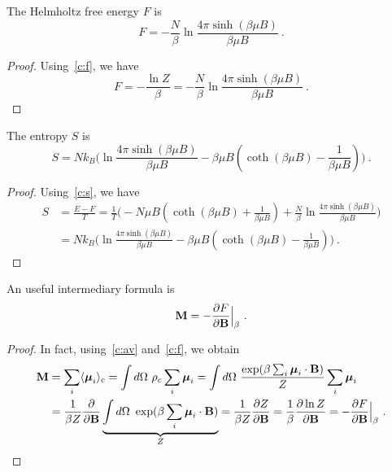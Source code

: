    The Helmholtz free energy $F$ is 
    \begin{equation*}
        F = - \frac{N}{\beta} \ln \frac{4 \pi \sinh (\beta \mu B)}{\beta \mu B} ~.
    \end{equation*}
    \begin{proof}
        Using~\eqref{c:f}, we have
        \begin{equation*}
            F = - \frac{\ln Z}{\beta} = - \frac{N}{\beta} \ln \frac{4 \pi \sinh (\beta \mu B)}{\beta \mu B} ~.
        \end{equation*}
    \end{proof}
    
    The entropy $S$ is 
    \begin{equation*}
        S = N k_B \Big ( \ln \frac{4 \pi \sinh (\beta \mu B)}{\beta \mu B}  - \beta \mu B (\coth (\beta \mu B) - \frac{1}{\beta \mu B} ) \Big ) ~.
    \end{equation*}
    \begin{proof}
        Using~\eqref{c:s}, we have
        \begin{equation*}
        \begin{aligned}
            S & = \frac{E - F}{T} = \frac{1}{T} \Big (- N \mu B (\coth (\beta \mu B) + \frac{1}{\beta \mu B} ) + \frac{N}{\beta} \ln \frac{4 \pi \sinh (\beta \mu B)}{\beta \mu B}  \Big ) \\ & = N k_B \Big ( \ln \frac{4 \pi \sinh (\beta \mu B)}{\beta \mu B}  - \beta \mu B (\coth (\beta \mu B) - \frac{1}{\beta \mu B} ) \Big )~. 
        \end{aligned}
        \end{equation*}
    \end{proof}

    An useful intermediary formula is 
    \begin{equation}\label{c:mag}
        \mathbf M = - \frac{\partial F}{\partial\mathbf B} \Big \vert_{\beta} ~.
    \end{equation}
    \begin{proof}
        In fact, using~\eqref{c:av} and~\eqref{c:f}, we obtain 
        \begin{equation*}
        \begin{aligned}
            \mathbf M & = \sum_i \langle\boldsymbol \mu_i\rangle_c = \int d\Omega ~ \rho_c \sum_i \boldsymbol \mu_i  = \int d\Omega ~ \frac{\exp(\beta \sum_i \boldsymbol \mu_i \cdot \mathbf B)}{Z} \sum_i \boldsymbol \mu_i \\ & = \frac{1}{\beta Z} \frac{\partial}{\partial\mathbf B} \underbrace{\int d\Omega ~ \exp(\beta \sum_i \boldsymbol \mu_i \cdot \mathbf B)}_Z = \frac{1}{\beta Z} \frac{\partial Z}{\partial\mathbf B} = \frac{1}{\beta} \frac{\partial\ln Z}{\partial\mathbf B} = - \frac{\partial F}{\partial\mathbf B} \Big \vert_{\beta} ~.
        \end{aligned}
        \end{equation*}
    \end{proof}

